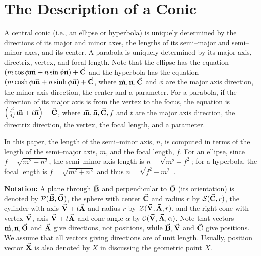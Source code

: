 
\section{The Description of a Conic}

A central conic (i.e., an ellipse or hyperbola) 
is uniquely determined by the directions of
its major and minor axes, the lengths of its semi--major and semi--minor 
axes, and its center.
A parabola is uniquely determined by its major axis, 
directrix, vertex, and focal length.
Note that the ellipse has the equation $(m\cos\phi\vec{\bf m}+n\sin\phi\vec{\bf n}
)+\vec{\bf C}$ and the hyperbola has the equation 
$(m\cosh\phi\vec{\bf m}+n\sinh\phi\vec{\bf n})+\vec{\bf C}$,
where $\vec{\bf m},\vec{\bf n},\vec{\bf C}$ and $\phi$ are the major
axis direction, the minor axis direction, the center and a parameter.
For a parabola, if the direction of its major axis is from the vertex to the
focus, the equation is $\left(\frac{t^2}{4f}\vec{\bf m}+t\vec{\bf n}\right)+
\vec{\bf C}$, where $\vec{\bf m},\vec{\bf n},\vec{\bf C},f$ and $t$ are the major
axis direction, the directrix direction, the vertex, the focal length,
and a parameter.

In this paper, the length of the semi--minor axis, $n$, is computed 
in terms of the length of the semi--major axis, $m$, and the focal length, $f$.
For an ellipse, since $f=\sqrt{m^2-n^2}$, 
the semi--minor axis length is $n=\sqrt{m^2-f^2}$;  
for a hyperbola, the focal length is
$f=\sqrt{m^2+n^2}$ and thus $n=\sqrt{f^2-m^2}$ \cite{salmon:1954}.  %

{\bf Notation:}
A plane through
$\vec{\bf B}$ and perpendicular to $\vec{\bf O}$ (its orientation) is denoted by
${\cal P}(\vec{\bf B},\vec{\bf O})$, the sphere with center $\vec{\bf C}$ and radius
$r$ by ${\cal S}(\vec{\bf C},r)$, the cylinder with axis $\vec{\bf V}+t\vec{\bf A}$
and radius $r$ by ${\cal Z}(\vec{\bf V},\vec{\bf A},r)$, and the right cone
with vertex $\vec{\bf V}$, axis $\vec{\bf V}+t\vec{\bf A}$ and cone angle $\alpha$
by ${\cal C}(\vec{\bf V},\vec{\bf A},\alpha)$.  Note that vectors $\vec{\bf m},
\vec{\bf n}, \vec{\bf O}$ and $\vec{\bf A}$ give directions, not positions, while
$\vec{\bf B},\vec{\bf V}$ and $\vec{\bf C}$ give positions.
We assume that all vectors giving directions are of unit length.
Usually, position vector $\vec{\bf X}$ is also denoted by $X$ in discussing the
geometric point $X$.

